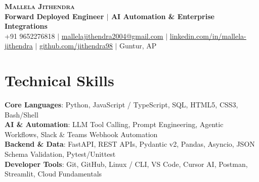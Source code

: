 \documentclass[letterpaper,10.8pt]{article}
\begin{document}
\begin{center}
    \textbf{\Huge \scshape Mallela Jithendra} \\ \vspace{2pt}
    \textbf{\large \color{MidnightBlue} Forward Deployed Engineer $|$ AI Automation \& Enterprise Integrations} \\ \vspace{3pt}
    \small +91 9652276818 $|$ 
    \href{mailto:mallelajithendra2004@gmail.com}{\underline{mallelajithendra2004@gmail.com}} $|$ 
    \href{https://linkedin.com/in/mallela-jithendra-935338251}{\underline{linkedin.com/in/mallela-jithendra}} $|$ 
    \href{https://github.com/jithendra98}{\underline{github.com/jithendra98}} $|$ 
    Guntur, AP
\end{center}

\vspace{-10pt}

\section{Technical Skills}
 \begin{itemize}[leftmargin=0.15in, label={}]
    \small{\item{
     \textbf{Core Languages}{: Python, JavaScript / TypeScript, SQL, HTML5, CSS3, Bash/Shell} \\ \vspace{1pt}
     \textbf{AI \& Automation}{: LLM Tool Calling, Prompt Engineering, Agentic Workflows, Slack \& Teams Webhook Automation} \\ \vspace{1pt}
     \textbf{Backend \& Data}{: FastAPI, REST APIs, Pydantic v2, Pandas, Asyncio, JSON Schema Validation, Pytest/Unittest} \\ \vspace{1pt}
     \textbf{Developer Tools}{: Git, GitHub, Linux / CLI, VS Code, Cursor AI, Postman, Streamlit, Cloud Fundamentals}
    }}
 \end{itemize}

\vspace{-12pt}

\end{document}
